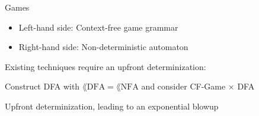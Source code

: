 \documentclass[../talk.tex]{subfiles}
\begin{document}
\begin{frame}{Games}
\begin{overlayarea}{\slidewidth}{\slideheight}
{            \begin{itemize}
                \item[] Left-hand side: Context-free game grammar

                \item[] Right-hand side: Non-deterministic automaton
            \end{itemize}

            \vspace*{1em}

                Existing techniques require an \alert{upfront determinization}:

                \vspace*{1em}

                Construct \alert{DFA} with $\lang{\text{DFA}} = \lang{\text{NFA}}$ and consider CF-Game $\times$ DFA

                \vspace*{1em}

                Upfront determinization, leading to an \alert{exponential blowup}
        }
    \end{overlayarea}
\end{frame}
\end{document}
